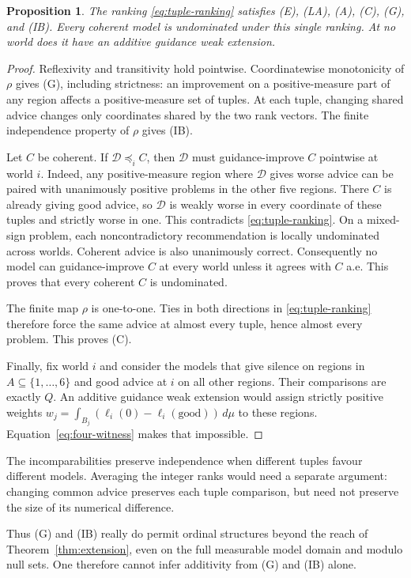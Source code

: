 \documentclass[11pt]{article}
\newtheorem{proposition}[theorem]{Proposition}
\theoremstyle{remark}\newtheorem{remark}[theorem]{Remark}
\newcommand{\Dscr}{\mathcal D}
\begin{document}
\begin{proposition}\label{prop:genuine}
The ranking \eqref{eq:tuple-ranking} satisfies (E), (LA), (A), (C), (G),
and (IB). Every coherent model is undominated under this single ranking.
At no world does it have an additive guidance weak extension.
\end{proposition}
\begin{proof}
Reflexivity and transitivity hold pointwise. Coordinatewise monotonicity of
$\rho$ gives (G), including strictness: an improvement on a positive-measure
part of any region affects a positive-measure set of tuples.
At each tuple, changing shared advice changes only coordinates shared by
the two rank vectors. The finite independence property of $\rho$ gives (IB).

Let $C$ be coherent. If $\Dscr\preceq_i C$, then $\Dscr$ must guidance-improve
$C$ pointwise at world $i$. Indeed, any positive-measure region where
$\Dscr$ gives worse advice can be paired with unanimously positive problems
in the other five regions. There $C$ is already giving good advice, so
$\Dscr$ is weakly worse in every coordinate of these tuples and strictly
worse in one. This contradicts \eqref{eq:tuple-ranking}.
On a mixed-sign problem, each noncontradictory recommendation is locally
undominated across worlds. Coherent advice is also unanimously correct.
Consequently no model can guidance-improve $C$ at every world unless it
agrees with $C$ a.e. This proves that every coherent $C$ is undominated.

The finite map $\rho$ is one-to-one. Ties in both directions in
\eqref{eq:tuple-ranking} therefore force the same advice at almost every
tuple, hence almost every problem. This proves (C).

Finally, fix world $i$ and consider the models that give silence on regions
in $A\subseteq\{1,\ldots,6\}$ and good advice at $i$ on all other regions.
Their comparisons are exactly $Q$. An additive guidance weak extension
would assign strictly positive weights
$w_j=\int_{B_j}(\ell_i(0)-\ell_i(\mathrm{good}))\,d\mu$ to these regions.
Equation~\eqref{eq:four-witness} makes that impossible.
\end{proof}

The incomparabilities preserve independence when different tuples favour
different models. Averaging the integer ranks would need a separate argument:
changing common advice preserves each tuple comparison, but need not preserve
the size of its numerical difference.

Thus (G) and (IB) really do permit ordinal structures beyond the reach of
Theorem~\ref{thm:extension}, even on the full measurable model domain and
modulo null sets. One therefore cannot infer additivity from (G) and (IB) alone.
\end{document}
